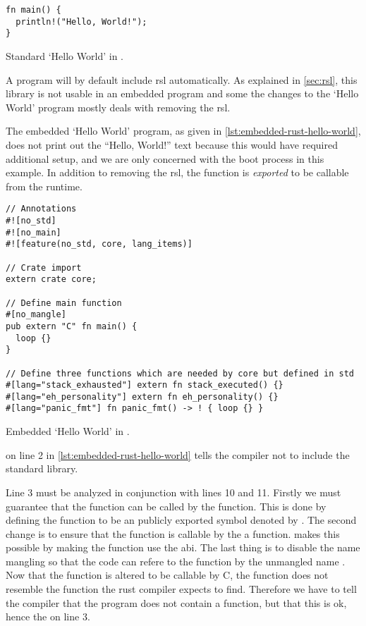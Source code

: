 \begin{listing}[H]
  \begin{verbatim}
fn main() {
  println!("Hello, World!");
}
  \end{verbatim}
  \caption{Standard `Hello World' in {\rust}.}
  \label{lst:rust-hello-world}
\end{listing}

A {\rust} program will by default include \gls{rsl} automatically.
As explained in \autoref{sec:rsl}, this library is not usable in an embedded program and some the changes to the `Hello World' program mostly deals with removing the \gls{rsl}.

The embedded `Hello World' program, as given in \autoref{lst:embedded-rust-hello-world}, does not print out the ``Hello, World!'' text because this would have required additional setup, and we are only concerned with the boot process in this example.
In addition to removing the \gls{rsl}, the {\main} function is \emph{exported} to be callable from the {\C} runtime.

\begin{listing}[H]
  \begin{verbatim}
// Annotations
#![no_std]
#![no_main]
#![feature(no_std, core, lang_items)]

// Crate import
extern crate core;

// Define main function
#[no_mangle]
pub extern "C" fn main() {
  loop {}
}

// Define three functions which are needed by core but defined in std
#[lang="stack_exhausted"] extern fn stack_executed() {}
#[lang="eh_personality"] extern fn eh_personality() {}
#[lang="panic_fmt"] fn panic_fmt() -> ! { loop {} }
\end{verbatim}
\caption{Embedded `Hello World' in {\rust}.}
\label{lst:embedded-rust-hello-world}
\end{listing}

\attrib{\#\![no\_std]} on line 2 in \autoref{lst:embedded-rust-hello-world} tells the {\rust} compiler not to include the standard library.

Line 3 must be analyzed in conjunction with lines 10 and 11.
Firstly we must guarantee that the function can be called by the  function.
This is done by defining the {\main} function to be an publicly exported symbol denoted by .
The second change is to ensure that the function is callable by the a {\C} function.
 makes this possible by making the function use the {\C} \gls{abi}.
The last thing is to disable the {\rust} name mangling so that the {\C} code can refere to the function by the unmangled name {\main}.
Now that the {\main} function is altered to be callable by C, the function does not resemble the function the rust compiler expects to find.
Therefore we have to tell the compiler that the program does not contain a {\main} function, but that this is ok, hence the \attrib{\#\![no\_main]} on line 3.

